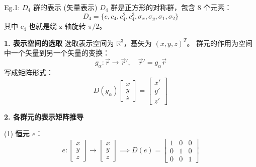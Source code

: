 \begin{example}{Eg.1: $D_4$ 群的表示 (矢量表示)}
    $D_4$ 群是正方形的对称群，包含 8 个元素：
    \begin{equation}
        D_4 = \{ e, c_4, c_4^2, c_4^3, \sigma_x, \sigma_y, \sigma_1, \sigma_2 \}
    \end{equation}
    其中 $c_4$ 也就是绕 z 轴旋转 $\pi/2$。
    
    \textbf{1. 表示空间的选取}
    选取表示空间为 $\mathbb{R}^3$，基矢为 $(x, y, z)^T$。
    群元的作用为空间中一个矢量到另一个矢量的变换：
    \begin{equation}
        g_\alpha: \vec{r} \to \vec{r}', \quad \vec{r}' = g_\alpha \vec{r}
    \end{equation}
    写成矩阵形式：
    \begin{equation}
        D(g_\alpha) \begin{bmatrix} x \\ y \\ z \end{bmatrix} = \begin{bmatrix} x' \\ y' \\ z' \end{bmatrix}
    \end{equation}

    \textbf{2. 各群元的表示矩阵推导}
    
    (1) \textbf{恒元 $e$}：
    \begin{equation}
        e: \begin{bmatrix} x \\ y \\ z \end{bmatrix} \to \begin{bmatrix} x \\ y \\ z \end{bmatrix} \implies D(e) = \begin{bmatrix} 1 & 0 & 0 \\ 0 & 1 & 0 \\ 0 & 0 & 1 \end{bmatrix}
    \end{equation}


\end{example}
